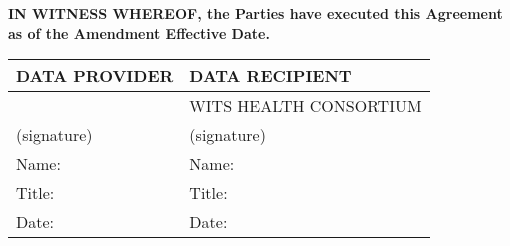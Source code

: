\documentclass[12pt,letterpaper]{article}
\newcommand{\added}[1]{\textcolor{addcolor}{#1}}
\begin{document}
\vspace{0.5cm}

\textbf{IN WITNESS WHEREOF, the Parties have executed this Agreement as of the \added{Amendment} Effective Date.}

\vspace{1cm}

\begin{tabular}{|p{}|p{}|}
\hline
\textbf{DATA PROVIDER} & \textbf{DATA RECIPIENT} \\
\hline
 & WITS HEALTH CONSORTIUM \\
\hline
(signature) & (signature) \\
\hline
Name: & Name: \\
\hline
Title: & Title: \\
\hline
Date: & Date: \\
\hline
\end{tabular}
\end{document}
